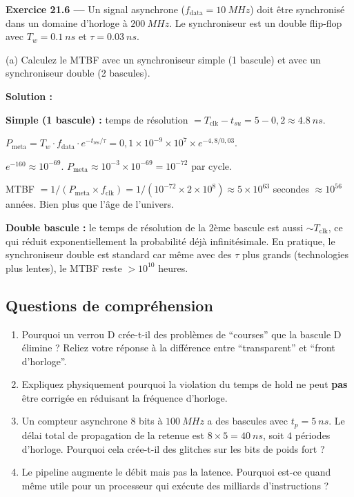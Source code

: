 \documentclass[12pt,a4paper,twoside]{book}
\begin{document}
\textbf{Exercice 21.6 ---} Un signal asynchrone ($f_{\text{data}} = \SI{10}{MHz}$) doit être synchronisé dans un domaine d'horloge à $\SI{200}{MHz}$. Le synchroniseur est un double flip-flop avec $T_w = \SI{0.1}{ns}$ et $\tau = \SI{0.03}{ns}$.

(a) Calculez le MTBF avec un synchroniseur simple (1 bascule) et avec un synchroniseur double (2 bascules).

\begin{pratique}
\textbf{Solution :}

\textbf{Simple (1 bascule) :} temps de résolution $= T_{\text{clk}} - t_{su} = 5 - 0{,}2 \approx \SI{4.8}{ns}$.

$P_{\text{meta}} = T_w \cdot f_{\text{data}} \cdot e^{-t_{\text{rés}}/\tau} = 0{,}1\times10^{-9}\times10^7\times e^{-4{,}8/0{,}03}$.

$e^{-160} \approx 10^{-69}$. $P_{\text{meta}} \approx 10^{-3}\times10^{-69} = 10^{-72}$ par cycle.

MTBF $= 1/(P_{\text{meta}} \times f_{\text{clk}}) = 1/(10^{-72}\times2\times10^8) \approx 5\times10^{63}$ secondes $\approx 10^{56}$ années. Bien plus que l'âge de l'univers.

\textbf{Double bascule :} le temps de résolution de la 2ème bascule est aussi $\sim T_{\text{clk}}$, ce qui réduit exponentiellement la probabilité déjà infinitésimale. En pratique, le synchroniseur double est standard car même avec des $\tau$ plus grands (technologies plus lentes), le MTBF reste $> 10^{10}$ heures.
\end{pratique}

\subsection*{Questions de compréhension}

\begin{enumerate}[nosep]
\item Pourquoi un verrou D crée-t-il des problèmes de ``courses'' que la bascule D élimine ? Reliez votre réponse à la différence entre ``transparent'' et ``front d'horloge''.
\item Expliquez physiquement pourquoi la violation du temps de hold ne peut \textbf{pas} être corrigée en réduisant la fréquence d'horloge.
\item Un compteur asynchrone 8 bits à $\SI{100}{MHz}$ a des bascules avec $t_p = \SI{5}{ns}$. Le délai total de propagation de la retenue est $8\times5 = \SI{40}{ns}$, soit $4$ périodes d'horloge. Pourquoi cela crée-t-il des glitches sur les bits de poids fort ?
\item Le pipeline augmente le débit mais pas la latence. Pourquoi est-ce quand même utile pour un processeur qui exécute des milliards d'instructions ?
\end{enumerate}
\end{document}
